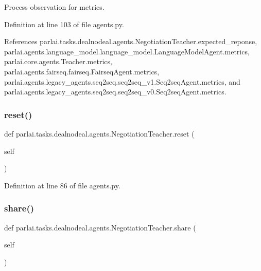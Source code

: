 \begin{DoxyVerb}Process observation for metrics.\end{DoxyVerb}
 

Definition at line 103 of file agents.\+py.



References parlai.\+tasks.\+dealnodeal.\+agents.\+Negotiation\+Teacher.\+expected\+\_\+reponse, parlai.\+agents.\+language\+\_\+model.\+language\+\_\+model.\+Language\+Model\+Agent.\+metrics, parlai.\+core.\+agents.\+Teacher.\+metrics, parlai.\+agents.\+fairseq.\+fairseq.\+Fairseq\+Agent.\+metrics, parlai.\+agents.\+legacy\+\_\+agents.\+seq2seq.\+seq2seq\+\_\+v1.\+Seq2seq\+Agent.\+metrics, and parlai.\+agents.\+legacy\+\_\+agents.\+seq2seq.\+seq2seq\+\_\+v0.\+Seq2seq\+Agent.\+metrics.

\mbox{\label{classparlai_1_1tasks_1_1dealnodeal_1_1agents_1_1NegotiationTeacher_a20b0ed1425ed8b1c6bc179220b766b19}} 
\subsubsection{\texorpdfstring{reset()}{reset()}}
{\footnotesize\ttfamily def parlai.\+tasks.\+dealnodeal.\+agents.\+Negotiation\+Teacher.\+reset (\begin{DoxyParamCaption}\item[{}]{self }\end{DoxyParamCaption})}



Definition at line 86 of file agents.\+py.

\mbox{\label{classparlai_1_1tasks_1_1dealnodeal_1_1agents_1_1NegotiationTeacher_a915e9437d2b0dc50973b3eea1711108b}} 
\subsubsection{\texorpdfstring{share()}{share()}}
{\footnotesize\ttfamily def parlai.\+tasks.\+dealnodeal.\+agents.\+Negotiation\+Teacher.\+share (\begin{DoxyParamCaption}\item[{}]{self }\end{DoxyParamCaption})}



